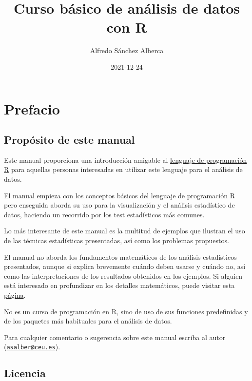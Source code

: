 \documentclass[
]{book}
\title{Curso básico de análisis de datos con R}
\author{Alfredo Sánchez Alberca}
\date{2021-12-24}
\begin{document}
\maketitle

{
\setcounter{tocdepth}{1}
\tableofcontents
}
\hypertarget{prefacio}{%
\chapter*{Prefacio}\label{prefacio}}

\hypertarget{propuxf3sito-de-este-manual}{%
\section*{Propósito de este manual}\label{propuxf3sito-de-este-manual}}

Este manual proporciona una introducción amigable al \href{https://www.r-project.org/}{lenguaje de programación R} para aquellas personas interesadas en utilizar este lenguaje para el análisis de datos.

El manual empieza con los conceptos básicos del lenguaje de programación R pero enseguida aborda su uso para la visualización y el análisis estadístico de datos, haciendo un recorrido por los test estadísticos más comunes.

Lo más interesante de este manual es la multitud de ejemplos que ilustran el uso de las técnicas estadísticas presentadas, así como los problemas propuestos.

El manual no aborda los fundamentos matemáticos de los análisis estadísticos presentados, aunque si explica brevemente cuándo deben usarse y cuándo no, así como las interpretaciones de los resultados obtenidos en los ejemplos. Si alguien está interesado en profundizar en los detalles matemáticos, puede visitar esta \href{https://aprendeconalf.es/docencia/estadistica/}{página}.

No es un curso de programación en R, sino de uso de sus funciones predefinidas y de los paquetes más habituales para el análisis de datos.

Para cualquier comentario o sugerencia sobre este manual escriba al autor (\href{mailto:asalber@ceu.es}{\nolinkurl{asalber@ceu.es}}).

\hypertarget{licencia}{%
\section*{Licencia}\label{licencia}}
\end{document}
